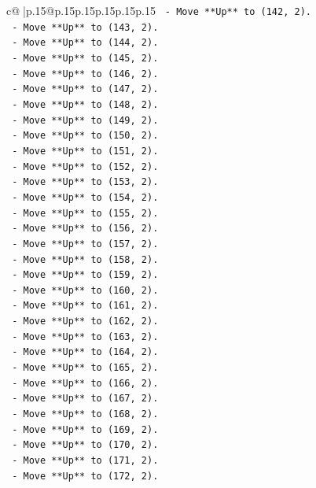 \documentclass{article}
\begin{document}
{\begin{supertabular}{c@{$\;$}|p{.15\linewidth}@{}p{.15\linewidth}p{.15\linewidth}p{.15\linewidth}p{.15\linewidth}p{.15\linewidth}}
{{{\texttt{    {-} Move **Up** to (142, 2).} \\
\texttt{    {-} Move **Up** to (143, 2).} \\
\texttt{    {-} Move **Up** to (144, 2).} \\
\texttt{    {-} Move **Up** to (145, 2).} \\
\texttt{    {-} Move **Up** to (146, 2).} \\
\texttt{    {-} Move **Up** to (147, 2).} \\
\texttt{    {-} Move **Up** to (148, 2).} \\
\texttt{    {-} Move **Up** to (149, 2).} \\
\texttt{    {-} Move **Up** to (150, 2).} \\
\texttt{    {-} Move **Up** to (151, 2).} \\
\texttt{    {-} Move **Up** to (152, 2).} \\
\texttt{    {-} Move **Up** to (153, 2).} \\
\texttt{    {-} Move **Up** to (154, 2).} \\
\texttt{    {-} Move **Up** to (155, 2).} \\
\texttt{    {-} Move **Up** to (156, 2).} \\
\texttt{    {-} Move **Up** to (157, 2).} \\
\texttt{    {-} Move **Up** to (158, 2).} \\
\texttt{    {-} Move **Up** to (159, 2).} \\
\texttt{    {-} Move **Up** to (160, 2).} \\
\texttt{    {-} Move **Up** to (161, 2).} \\
\texttt{    {-} Move **Up** to (162, 2).} \\
\texttt{    {-} Move **Up** to (163, 2).} \\
\texttt{    {-} Move **Up** to (164, 2).} \\
\texttt{    {-} Move **Up** to (165, 2).} \\
\texttt{    {-} Move **Up** to (166, 2).} \\
\texttt{    {-} Move **Up** to (167, 2).} \\
\texttt{    {-} Move **Up** to (168, 2).} \\
\texttt{    {-} Move **Up** to (169, 2).} \\
\texttt{    {-} Move **Up** to (170, 2).} \\
\texttt{    {-} Move **Up** to (171, 2).} \\
\texttt{    {-} Move **Up** to (172, 2).} \\
}}}
\end{supertabular}}
\end{document}
